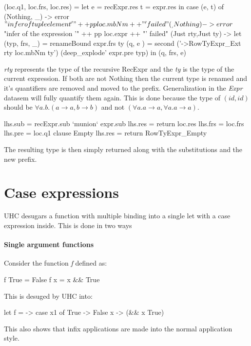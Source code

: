 \begin{code}    
   (loc.q1, loc.frs, loc.res)
     = let e = recExpr.res
           t = expr.res
       in case (e, t) of
            (Nothing, _) -> error $ "infer of tuple element '" ++ pp loc.mbNm ++ "' failed"
            (_, Nothing) -> error $ "infer of the expression '" ++ pp loc.expr ++ "' failed"
            (Just rty,Just ty) -> 
               let (typ, frs, _) = renameBound expr.frs ty 
                   (q,   e     ) = second (\ty'->RowTyExpr_Ext rty loc.mbNm ty') 
                                          (deep_explode' expr.pre typ)
               in (q, frs, e)
\end{code}
\emph{rty} represents the type of the recursive RecExpr and the \emph{ty} is the type of the current expression. If both are not Nothing then the current type is renamed and it's quantifiers are removed and moved to the prefix. Generalization in the \emph{Expr} datasem will fully quantify them again. This is done because the type of $(id, id)$ should be $\forall a. b. (a \rightarrow a, b \rightarrow b)$ and not $(\forall a. a \rightarrow a, \forall a. a \rightarrow a)$.

\begin{code}                              
      lhs.sub = recExpr.sub `munion` expr.sub
      lhs.res = return loc.res
      lhs.frs = loc.frs
      lhs.pre = loc.q1
   clause Empty
      lhs.res = return RowTyExpr_Empty
\end{code}
The resulting type is then simply returned along with the substitutions and the new prefix. 

\section{Case expressions}
UHC desugars a function with multiple binding into a single let with a case expression inside. This is done in two ways
\paragraph{Single argument functions}
Consider the function \emph{f} defined as:
\begin{code}
f True = False
f x    = x && True
\end{code}
This is desuged by UHC into:
\begin{code}
let f =  -> case x1 of
                 True -> False
                 x -> (&& x True)
\end{code}
This also shows that infix applications are made into the normal application style.

